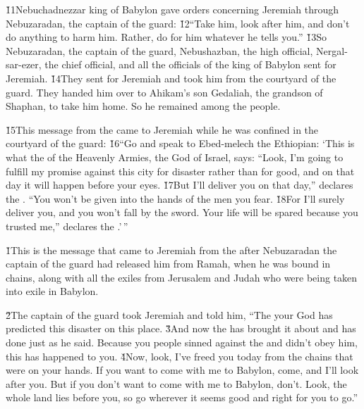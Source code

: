 \v{11}Nebuchadnezzar king of Babylon gave orders concerning Jeremiah through Nebuzaradan, the captain of the guard: \v{12}``Take him, look after him, and don't do anything to harm him. Rather, do for him whatever he tells you.'' \v{13}So Nebuzaradan, the captain of the guard, Nebushazban, the high official, Nergal-sar-ezer, the chief official, and all the officials of the king of Babylon sent for Jeremiah. \v{14}They sent for Jeremiah and took him from the courtyard of the guard. They handed him over to Ahikam's son Gedaliah, the grandson of Shaphan, to take him home. So he remained among the people.

\v{15}This message from the  came to Jeremiah while he was confined in the courtyard of the guard: \v{16}``Go and speak to Ebed-melech the Ethiopian: `This is what the  of the Heavenly Armies, the God of Israel, says: ``Look, I'm going to fulfill my promise against this city for disaster rather than for good, and on that day it will happen before your eyes. \v{17}But I'll deliver you on that day,'' declares the . ``You won't be given into the hands of the men you fear. \v{18}For I'll surely deliver you, and you won't fall by the sword. Your life will be spared because you trusted me,'' declares the .'\,''

\v{1}This is the message that came to Jeremiah from the  after Nebuzaradan the captain of the guard had released him from Ramah, when he was bound in chains, along with all the exiles from Jerusalem and Judah who were being taken into exile in Babylon.

\v{2}The captain of the guard took Jeremiah and told him, ``The  your God has predicted this disaster on this place. \v{3}And now the  has brought it about and has done just as he said. Because you people sinned against the  and didn't obey him, this has happened to you. \v{4}Now, look, I've freed you today from the chains that were on your hands. If you want to come with me to Babylon, come, and I'll look after you. But if you don't want to come with me to Babylon, don't. Look, the whole land lies before you, so go wherever it seems good and right for you to go.''

